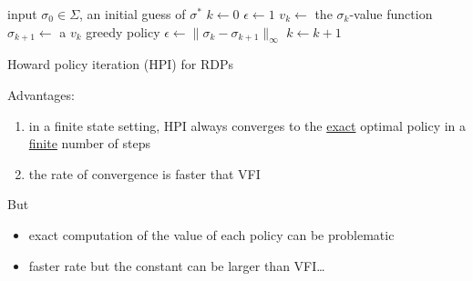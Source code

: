 \begin{frame}
        
    {\small
    \begin{algorithm}[H]
        \DontPrintSemicolon
        input $\sigma_0 \in \Sigma$, an initial guess of $\sigma^*$ \;
        $k \leftarrow 0$ \;
        $\epsilon \leftarrow 1$ \;
        {
            $v_k \leftarrow $ the $\sigma_k$-value function \;
            $\sigma_{k+1} \leftarrow $ a $v_k$ greedy policy \;
            $\epsilon \leftarrow \| \sigma_k - \sigma_{k+1} \|_\infty$ \;
            $k \leftarrow k + 1$ \;
        }
        \caption{\label{algo:fshpi} Howard policy iteration (HPI) for RDPs}
    \end{algorithm}
    }

\end{frame}

\begin{frame}
    
    Advantages:
    \begin{enumerate}
        \item in a finite state setting, HPI always converges to the
            \underline{exact} optimal policy in a \underline{finite} number of steps
        \vspace{0.5em}
        \item the rate of convergence is faster that VFI 
    \end{enumerate}


        \vspace{0.5em}
      But 
      \begin{itemize}
          \item exact computation of the value of each policy can be
              problematic
          \item faster rate but the constant can be larger than VFI\ldots
      \end{itemize}


\end{frame}


